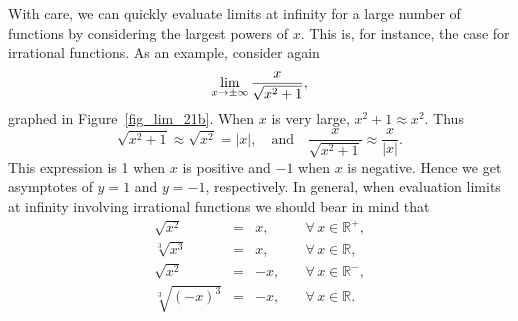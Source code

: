With care, we can quickly evaluate limits at infinity for a large number of functions by considering the largest powers of $x$. This is, for instance, the case for irrational functions.  As an example, consider again 
$$\displaystyle\lim_{x\to\pm\infty}\frac{x}{\sqrt{x^2+1}},$$
graphed in Figure~\ref{fig_lim_21b}. When $x$ is very large, $x^2+1 \approx x^2$. Thus 
$$\sqrt{x^2+1}\approx \sqrt{x^2} = |x|,\quad \text{and}\quad \frac{x}{\sqrt{x^2+1}} \approx \frac{x}{|x|}.$$
 This expression is 1 when $x$ is positive and $-1$ when $x$ is negative. Hence we get asymptotes of $y=1$ and $y=-1$, respectively. In general, when evaluation limits at infinity involving irrational functions we should bear in mind that 
\[ 
\begin{array}{rcll}
\sqrt{x^2}&=&x, \quad & \forall\, x\in\mathbb{R}^+,\\  
\sqrt[3]{x^3}&=&x, \quad& \forall \, x\in\mathbb{R},\\
\sqrt{x^2}&=&-x, \quad & \forall\, x\in\mathbb{R}^-,\\
\sqrt[3]{(-x)^3}&=&-x, \quad& \forall \, x\in\mathbb{R}.
\end{array}
\] 

